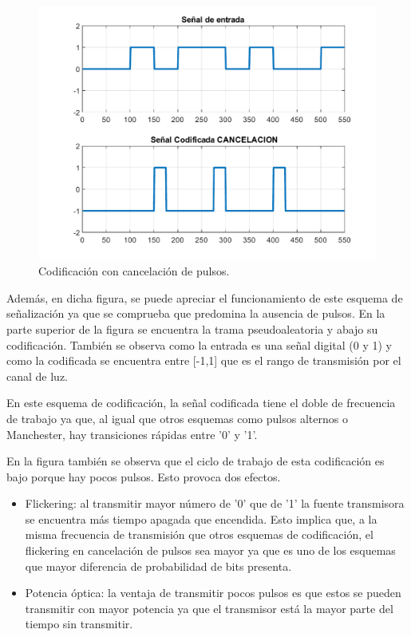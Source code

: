 \begin{figure}[ht]
    \centering
    \includegraphics[scale=0.6]{./figuras/CodificadaCancelacion.pdf}
    \caption{\small{Codificación con cancelación de pulsos.}}
    \label{codificación_cancelacion}%
\end{figure}

Además, en dicha figura, se puede apreciar el funcionamiento de este esquema de señalización 
ya que se comprueba que predomina la ausencia de pulsos. En la parte superior de la figura 
se encuentra la trama pseudoaleatoria y abajo su codificación. También se 
observa como la entrada es una señal digital (0 y 1) y como la codificada se encuentra
entre [-1,1] que es el rango de transmisión por el canal de luz.

En este esquema de codificación, la señal codificada tiene el doble de frecuencia de 
trabajo ya que, al igual que otros esquemas como pulsos alternos o Manchester, hay 
transiciones rápidas entre '0' y '1'. 

En la figura también se observa que el ciclo de trabajo de esta codificación es 
bajo porque hay pocos pulsos. Esto provoca dos efectos.
\begin{itemize}
    \item Flickering: al transmitir mayor número de '0' que de '1' la fuente transmisora
        se encuentra más tiempo apagada que encendida. Esto implica que, a la misma 
        frecuencia de transmisión que otros esquemas de codificación, el flickering en 
        cancelación de pulsos sea mayor ya que es uno de los esquemas que mayor 
        diferencia de probabilidad de bits presenta.
    \item Potencia óptica: la ventaja de transmitir pocos pulsos es que estos se pueden 
        transmitir con mayor potencia ya que el transmisor está la mayor parte del tiempo
        sin transmitir. 
\end{itemize}

